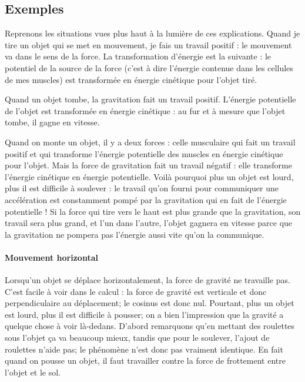 \subsection{Exemples}

Reprenons les situations vues plus haut à la lumière de ces explications. Quand je tire un objet qui se met en mouvement, je fais un travail positif : le mouvement va dans le sens de la force. La transformation d'énergie est la suivante : le potentiel de la source de la force (c'est à dire l'énergie contenue dans les cellules de mes muscles) est transformée en énergie cinétique pour l'objet tiré.

Quand un objet tombe, la gravitation fait un travail positif. L'énergie potentielle de l'objet est transformée en énergie cinétique : au fur et à mesure que l'objet tombe, il gagne en vitesse.

Quand on monte un objet, il y a deux forces : celle musculaire qui fait un travail positif et qui transforme l'énergie potentielle des muscles en énergie cinétique pour l'objet. Mais la force de gravitation fait un travail négatif : elle transforme l'énergie cinétique en énergie potentielle. Voilà pourquoi plus un objet est lourd, plus il est difficile à soulever : le travail qu'on fourni pour communiquer une accélération est constamment pompé par la gravitation qui en fait de l'énergie potentielle ! Si la force qui tire vers le haut est plus grande que la gravitation, son travail sera plus grand, et l'un dans l'autre, l'objet gagnera en vitesse parce que la gravitation ne pompera pas l'énergie aussi vite qu'on la communique.

\paragraph{Mouvement horizontal}

Lorsqu'un objet se déplace horizontalement, la force de gravité ne travaille pas. C'est facile à voir dans le calcul : la force de gravité est verticale et donc perpendiculaire au déplacement; le cosinus est donc nul. Pourtant, plus un objet est lourd, plus il est difficile à pousser; on a bien l'impression que la gravité a quelque chose à voir là-dedans. D'abord remarquons qu'en mettant des roulettes sous l'objet ça va beaucoup mieux, tandis que pour le soulever, l'ajout de roulettes n'aide pas; le phénomène n'est donc pas vraiment identique. En fait quand on pousse un objet, il faut travailler contre la force de frottement entre l'objet et le sol.

